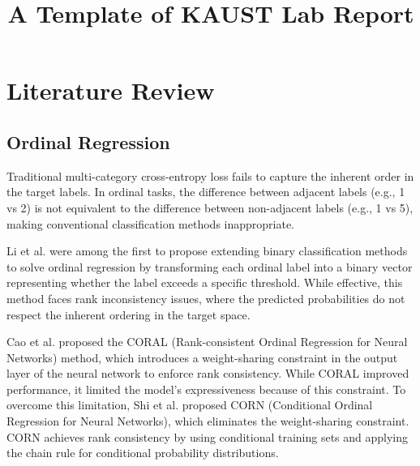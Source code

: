 \documentclass{report}
\title{A Template of KAUST Lab Report}
\begin{document}
\subject{CS 6956} %



\buildmargins %
\buildcover %


\section*{Literature Review}

\subsection*{Ordinal Regression}
Traditional multi-category cross-entropy loss fails to capture the inherent order in the target labels. In ordinal tasks, the difference between adjacent labels (e.g., 1 vs 2) is not equivalent to the difference between non-adjacent labels (e.g., 1 vs 5), making conventional classification methods inappropriate.

Li et al. \cite{li2006ordinal} were among the first to propose extending binary classification methods to solve ordinal regression by transforming each ordinal label into a binary vector representing whether the label exceeds a specific threshold. While effective, this method faces rank inconsistency issues, where the predicted probabilities do not respect the inherent ordering in the target space.

Cao et al. \cite{cao2020rank} proposed the CORAL (Rank-consistent Ordinal Regression for Neural Networks) method, which introduces a weight-sharing constraint in the output layer of the neural network to enforce rank consistency. While CORAL improved performance, it limited the model's expressiveness because of this constraint.
To overcome this limitation, Shi et al. \cite{ordinal_regr1} proposed CORN (Conditional Ordinal Regression for Neural Networks), which eliminates the weight-sharing constraint. CORN achieves rank consistency by using conditional training sets and applying the chain rule for conditional probability distributions.
\end{document}
